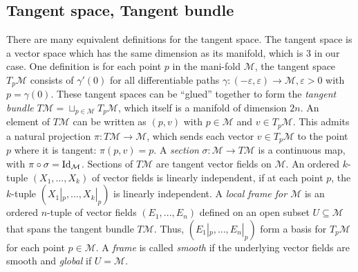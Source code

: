 \documentclass[../thesis.tex]{subfiles}
\begin{document}
\subsection{Tangent space, Tangent bundle} There are many equivalent definitions
for the tangent space. The tangent space is a vector space which has the same dimension as its manifold,
which is 3 in our case.
One definition is for each point $p$ in the mani-fold $\mathcal{M}$,
the tangent space $T_p\mathcal{M}$ consists of $\gamma'(0)$ for all differentiable paths ${\gamma: (-\varepsilon, \varepsilon) \to \mathcal{M}, \varepsilon > 0}$
with $p = \gamma(0)$.
These tangent spaces can be ``glued'' together to form the
\emph{tangent bundle} $T\mathcal{M} = \sqcup _{p \in \mathcal{M}}T_p\mathcal{M}$, which itself
is a manifold of dimension $2n$. An element of $T\mathcal{M}$ can be written
as $(p,v)$ with $p \in \mathcal{M}$ and $v \in T_p\mathcal{M}$. This admits a natural projection $\pi : T\mathcal{M} \to \mathcal{M}$,
which sends each vector $v \in T_p\mathcal{M}$ to the point $p$ where it is tangent: $\pi(p,v)=p$.
A \emph{section} $\sigma: \mathcal{M} \to T\mathcal{M}$ is a continuous map, with $\pi \circ \sigma = \operatorname{Id}_{\mathcal{M}}$.
Sections of $T\mathcal{M}$ are tangent vector fields on $\mathcal{M}$.
An ordered $k$-tuple $(X_1, \dots, X_k)$ of vector fields is linearly independent,
if at each point $p$, the $k$-tuple $(X_1|_p, \dots, X_k|_p)$ is linearly independent.
A \emph{local frame for $\mathcal{M}$} is an ordered $n$-tuple of vector fields $(E_1, ..., E_n)$
defined on an open subset $U\subseteq \mathcal{M}$
that spans the tangent bundle $T\mathcal{M}$. Thus, $(E_1|_p,\dots, E_n|_p)$ form
a basis for $T_p\mathcal{M}$ for each point $p\in \mathcal{M}$.
A \emph{frame} is called \emph{smooth} if the underlying vector fields are smooth and \emph{global} if $U = \mathcal{M}$.
\end{document}
